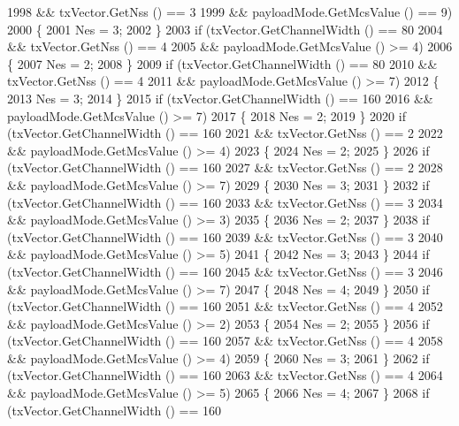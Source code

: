 \begin{DoxyCode}
1998           && txVector.GetNss () == 3
1999           && payloadMode.GetMcsValue () == 9)
2000         \{
2001           Nes = 3;
2002         \}
2003       \textcolor{keywordflow}{if} (txVector.GetChannelWidth () == 80
2004           && txVector.GetNss () == 4
2005           && payloadMode.GetMcsValue () >= 4)
2006         \{
2007           Nes = 2;
2008         \}
2009       \textcolor{keywordflow}{if} (txVector.GetChannelWidth () == 80
2010           && txVector.GetNss () == 4
2011           && payloadMode.GetMcsValue () >= 7)
2012         \{
2013           Nes = 3;
2014         \}
2015       \textcolor{keywordflow}{if} (txVector.GetChannelWidth () == 160
2016           && payloadMode.GetMcsValue () >= 7)
2017         \{
2018           Nes = 2;
2019         \}
2020       \textcolor{keywordflow}{if} (txVector.GetChannelWidth () == 160
2021           && txVector.GetNss () == 2
2022           && payloadMode.GetMcsValue () >= 4)
2023         \{
2024           Nes = 2;
2025         \}
2026       \textcolor{keywordflow}{if} (txVector.GetChannelWidth () == 160
2027           && txVector.GetNss () == 2
2028           && payloadMode.GetMcsValue () >= 7)
2029         \{
2030           Nes = 3;
2031         \}
2032       \textcolor{keywordflow}{if} (txVector.GetChannelWidth () == 160
2033           && txVector.GetNss () == 3
2034           && payloadMode.GetMcsValue () >= 3)
2035         \{
2036           Nes = 2;
2037         \}
2038       \textcolor{keywordflow}{if} (txVector.GetChannelWidth () == 160
2039           && txVector.GetNss () == 3
2040           && payloadMode.GetMcsValue () >= 5)
2041         \{
2042           Nes = 3;
2043         \}
2044       \textcolor{keywordflow}{if} (txVector.GetChannelWidth () == 160
2045           && txVector.GetNss () == 3
2046           && payloadMode.GetMcsValue () >= 7)
2047         \{
2048           Nes = 4;
2049         \}
2050       \textcolor{keywordflow}{if} (txVector.GetChannelWidth () == 160
2051           && txVector.GetNss () == 4
2052           && payloadMode.GetMcsValue () >= 2)
2053         \{
2054           Nes = 2;
2055         \}
2056       \textcolor{keywordflow}{if} (txVector.GetChannelWidth () == 160
2057           && txVector.GetNss () == 4
2058           && payloadMode.GetMcsValue () >= 4)
2059         \{
2060           Nes = 3;
2061         \}
2062       \textcolor{keywordflow}{if} (txVector.GetChannelWidth () == 160
2063           && txVector.GetNss () == 4
2064           && payloadMode.GetMcsValue () >= 5)
2065         \{
2066           Nes = 4;
2067         \}
2068       \textcolor{keywordflow}{if} (txVector.GetChannelWidth () == 160

\end{DoxyCode}
